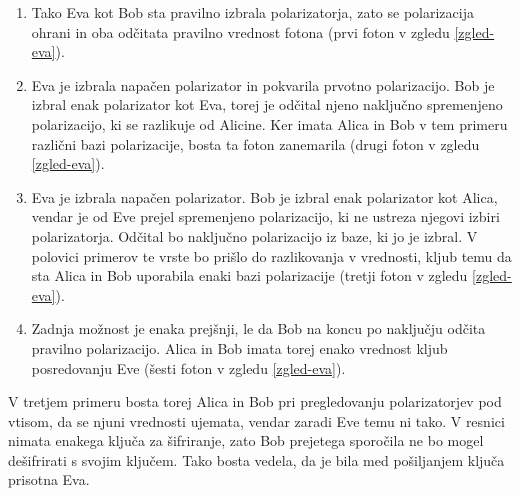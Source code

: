 \documentclass[A4paper, 11pt]{article}
\begin{document}
\begin{enumerate}

\item Tako Eva kot Bob sta pravilno izbrala polarizatorja, zato se polarizacija ohrani in oba odčitata pravilno vrednost fotona (prvi foton v  zgledu \ref{zgled-eva}).

\item Eva je izbrala napačen polarizator in pokvarila prvotno polarizacijo. Bob je izbral enak polarizator kot Eva, torej je odčital njeno naključno spremenjeno polarizacijo, ki se razlikuje od Alicine. Ker imata Alica in Bob v tem primeru različni bazi polarizacije, bosta ta foton zanemarila (drugi foton v  zgledu \ref{zgled-eva}).

\item Eva je izbrala napačen polarizator. Bob je izbral enak polarizator kot Alica, vendar je od Eve prejel spremenjeno polarizacijo, ki ne ustreza njegovi izbiri polarizatorja. Odčital bo naključno polarizacijo iz baze, ki jo je izbral. V polovici primerov te vrste bo prišlo do razlikovanja v vrednosti, kljub temu da sta Alica in Bob uporabila enaki bazi polarizacije (tretji foton v zgledu \ref{zgled-eva}).

\item Zadnja možnost je enaka prejšnji, le da Bob na koncu po naključju odčita pravilno polarizacijo. Alica in Bob imata torej enako vrednost kljub posredovanju Eve (šesti foton v  zgledu \ref{zgled-eva}).

\end{enumerate}

V tretjem primeru bosta torej Alica in Bob pri pregledovanju polarizatorjev pod vtisom, da se njuni vrednosti ujemata, vendar zaradi Eve temu ni tako. V resnici nimata enakega ključa za šifriranje, zato Bob prejetega sporočila ne bo mogel dešifrirati s svojim ključem. Tako bosta vedela, da je bila med pošiljanjem ključa prisotna Eva.

\pagebreak
\end{document}
